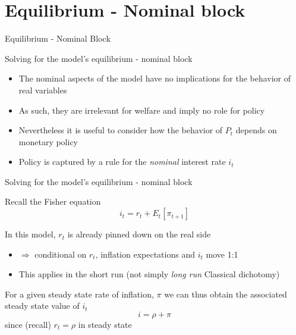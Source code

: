 \section{Equilibrium - Nominal block}

\begin{frame}

\begin{center}
{\LARGE Equilibrium - Nominal Block}
\end{center}

\end{frame}



\begin{frame}{Solving for the model's equilibrium - nominal block}

\begin{itemize}
\item	The nominal aspects of the model have no implications for the behavior of real variables
\item	As such, they are irrelevant for welfare and imply no role for policy
\item	Nevertheless it is useful to consider how the behavior of $P_{t}$ depends on monetary policy
\item	Policy is captured by a rule for the \emph{nominal} interest rate $i_{t}$
\end{itemize}

\end{frame}



\begin{frame}{Solving for the model's equilibrium - nominal block}

Recall the Fisher equation
\[
i_{t} = r_{t} + E_{t}[ \pi_{t+1} ]
\]

In this model, $r_{t}$ is already pinned down on the real side
\begin{itemize}
\item	$\Rightarrow$ conditional on $r_{t}$, inflation expectations and $i_{t}$ move 1:1
\item	This applies in the short run (not simply \emph{long run} Classical dichotomy)
\end{itemize}

\vspace{3mm}
For a given steady state rate of inflation, $\pi$ we can thus obtain the associated steady state value of $i_{t}$
\[
i = \rho + \pi
\]
since (recall) $r_{t}=\rho$ in steady state

\end{frame}

